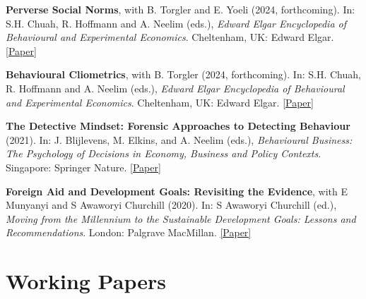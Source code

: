\documentclass[letterpaper]{article}
\renewenvironment{itemize}{
  \begin{list}{}{
    \setlength{\leftmargin}{1.5em}
  }
}{
  \end{list}
}
\begin{document}
\begin{itemize}

	\item {\bf Perverse Social Norms}, with B. Torgler and E. Yoeli (2024, forthcoming). In: S.H. Chuah, R. Hoffmann and A. Neelim (eds.), \textit{Edward Elgar Encyclopedia of Behavioural and Experimental Economics}. Cheltenham, UK: Edward Elgar. \href{https://drive.google.com/file/d/132rMWFxxwCWb974hB2EOs1SABoPdYFEX/view}{[Paper]}
		
	\medskip

	\item {\bf Behavioural Cliometrics}, with B. Torgler (2024, forthcoming). In: S.H. Chuah, R. Hoffmann and A. Neelim (eds.), \textit{Edward Elgar Encyclopedia of Behavioural and Experimental Economics}. Cheltenham, UK: Edward Elgar. \href{https://drive.google.com/file/d/132rMWFxxwCWb974hB2EOs1SABoPdYFEX/view}{[Paper]}
	
	\medskip

	\item {\bf The Detective Mindset: Forensic Approaches to Detecting Behaviour} (2021). In: J. Blijlevens, M. Elkins, and A. Neelim (eds.), \textit{Behavioural Business: The Psychology of Decisions in Economy, Business and Policy Contexts}. Singapore: Springer Nature. \href{https://drive.google.com/file/d/132rMWFxxwCWb974hB2EOs1SABoPdYFEX/view}{[Paper]}
	
	\medskip
	
	\item {\bf Foreign Aid and Development Goals: Revisiting the Evidence}, with E Munyanyi and S Awaworyi Churchill (2020). In: S Awaworyi Churchill (ed.), \textit{Moving from the Millennium to the Sustainable Development Goals: Lessons and Recommendations}. London: Palgrave MacMillan. \href{https://link.springer.com/chapter/10.1007\%2F978-981-15-1556-9_9}{[Paper]}
	



\end{itemize}


\section*{Working Papers}
				
\end{document}
